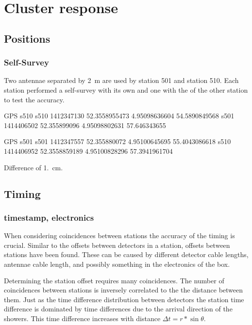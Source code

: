 \chapter{Cluster response}


\section{Positions}

\subsection{\gps Self-Survey}

Two \gps antennae separated by \SI{2}{\meter} are used by station 501
and station 510. Each station performed a self-survey with its own \gps
and one with the \gps of the other station to test the accuracy.
 
GPS s510
s510  1412347130	52.3558955473	4.95098636604	54.5890849568
s501  1414406502	52.355899096	4.95098802631	57.646343655

GPS s501
s501  1412347557	52.355880072	4.95100645695	55.4043086618
s510  1414406952	52.3558859189	4.95100828296	57.3941961704

Difference of \SI{1.}{\centi\meter}.


\section{Timing}

\subsection{\gps timestamp, electronics}

When considering coincidences between stations the accuracy of the
timing is crucial. Similar to the offsets between detectors in a
station, offsets between stations have been found. These can be caused
by different detector cable lengths, \gps antennae cable length, and
possibly something in the electronics of the \hisparc box.

Determining the station offset requires many coincidences. The number of
coincidences between stations is inversely correlated to the the
distance between them. Just as the time difference distribution between
detectors the station time difference is dominated by time differences
due to the arrival direction of the showers. This time difference
increases with distance $\Delta t = r * \sin{\theta}$.

